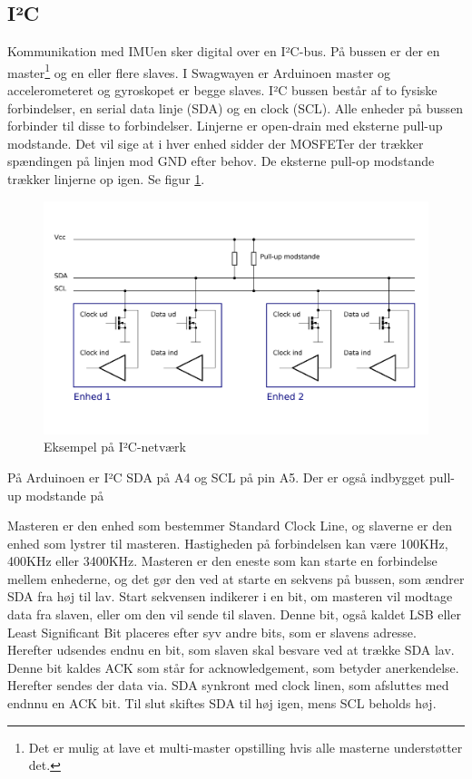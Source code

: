 \documentclass[a4paper,oneside,article,danish,table]{memoir}
\begin{document}
\subsection{I²C}
Kommunikation med IMUen sker digital over en I²C-bus. På bussen er der en master\footnote{Det er mulig at lave et multi-master opstilling hvis alle masterne understøtter det.} og en eller flere slaves. I Swagwayen er Arduinoen master og accelerometeret og gyroskopet er begge slaves. I²C bussen består af to fysiske forbindelser, en serial data linje (SDA) og en clock (SCL). Alle enheder på bussen forbinder til disse to forbindelser. Linjerne er open-drain med eksterne pull-up modstande. Det vil sige at i hver enhed sidder der MOSFETer der trækker spændingen på linjen mod GND efter behov. De eksterne pull-op modstande trækker linjerne op igen. Se figur \ref{fig:i2cbasic}.
\begin{figure}[htbp]
  \centering
  \includegraphics[width=\textwidth]{pictures/I2Cbasic.pdf}
  \caption{Eksempel på I²C-netværk}
  \label{fig:i2cbasic}
\end{figure}

På Arduinoen er I²C SDA på A4 og SCL på pin A5. Der er også indbygget pull-up modstande på 

Masteren er den enhed som bestemmer Standard Clock Line, og slaverne er den enhed som lystrer til masteren. Hastigheden på forbindelsen kan være 100KHz, 400KHz eller 3400KHz. Masteren er den eneste som kan starte en forbindelse mellem enhederne, og det gør den ved at starte en sekvens på bussen, som ændrer SDA fra høj til lav. Start sekvensen indikerer i en bit, om masteren vil modtage data fra slaven, eller om den vil sende til slaven. Denne bit, også kaldet LSB eller Least Significant Bit placeres efter syv andre bits, som er slavens adresse. Herefter udsendes endnu en bit, som slaven skal besvare ved at trække SDA lav. Denne bit kaldes ACK som står for acknowledgement, som betyder anerkendelse. Herefter sendes der data via. SDA synkront med clock linen, som afsluttes med endnnu en ACK bit. Til slut skiftes SDA til høj igen, mens SCL beholds høj.  
\end{document}
